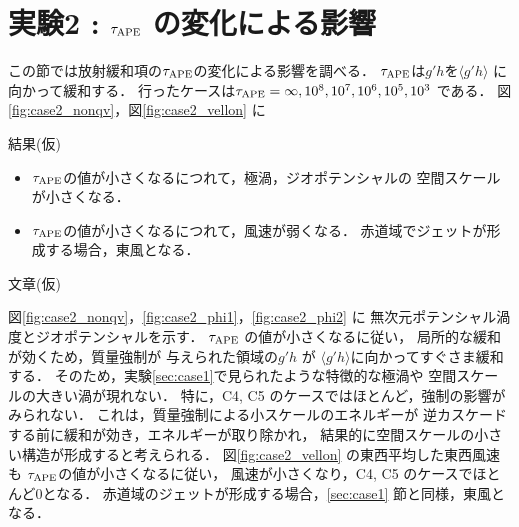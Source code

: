 \documentclass[a4j,12pt,openbib,oneside]{jreport}
\begin{document}
\section{実験2 : $\tau_{\rm{APE}}$ の変化による影響}
\label{sec:case2}
この節では放射緩和項の$\tau_{\rm{APE}}$の変化による影響を調べる．
$\tau_{\rm{APE}}$は$g'h$を$\langle g'h \rangle $ に向かって緩和する．
行ったケースは$\tau_{\rm{APE}} = \infty, 10^8, 10^7, 10^6, 10^5, 10^3$ である．
図\ref{fig:case2_nonqv}，図\ref{fig:case2_vellon} に

結果(仮)
\begin{itemize}
\item{$\tau_{\rm{APE}}$の値が小さくなるにつれて，極渦，ジオポテンシャルの
空間スケールが小さくなる．}
\item{$\tau_{\rm{APE}}$の値が小さくなるにつれて，風速が弱くなる．
赤道域でジェットが形成する場合，東風となる．}
\end{itemize}
%

文章(仮) 

図\ref{fig:case2_nonqv}，\ref{fig:case2_phi1}，\ref{fig:case2_phi2} に
無次元ポテンシャル渦度とジオポテンシャルを示す．
%
$\tau_{\rm{APE}}$ の値が小さくなるに従い，
局所的な緩和が効くため，質量強制が
与えられた領域の$g'h$ が $\langle g'h \rangle$に向かってすぐさま緩和する．
そのため，実験\ref{sec:case1}で見られたような特徴的な極渦や
空間スケールの大きい渦が現れない．
特に，C4, C5 のケースではほとんど，強制の影響がみられない．
%
これは，質量強制による小スケールのエネルギーが
逆カスケードする前に緩和が効き，エネルギーが取り除かれ，
結果的に空間スケールの小さい構造が形成すると考えられる．
%
図\ref{fig:case2_vellon} の東西平均した東西風速も
$\tau_{\rm{APE}}$の値が小さくなるに従い，
風速が小さくなり，C4, C5 のケースでほとんど0となる．
赤道域のジェットが形成する場合，\ref{sec:case1} 節と同様，東風となる．
%
\end{document}
